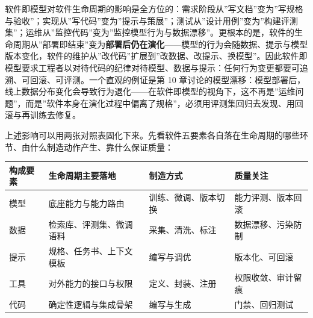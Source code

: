 \documentclass[
]{ctexbook}
\newcounter{none}
\begin{document}
软件即模型对软件生命周期的影响是全方位的：需求阶段从''写文档''变为''写规格与验收''；实现从''写代码''变为''提示与策展''；测试从''设计用例''变为''构建评测集''；运维从''监控代码''变为''监控模型行为与数据漂移''。更根本的是，软件的生命周期从''部署即结束''变为\textbf{部署后仍在演化}------模型的行为会随数据、提示与模型版本变化，软件的维护从''改代码''扩展到''改数据、改提示、换模型''。因此软件即模型要求工程者以对待代码的纪律对待模型、数据与提示：任何行为变更都要可追溯、可回滚、可评测。一个直观的例证是第
10
章讨论的模型漂移：模型部署后，线上数据分布变化会导致行为退化------在软件即模型的视角下，这不再是''运维问题''，而是''软件本身在演化过程中偏离了规格''，必须用评测集回归去发现、用回滚与再训练去修复。

上述影响可以用两张对照表固化下来。先看软件五要素各自落在生命周期的哪些环节、由什么制造动作产生、靠什么保证质量：

{\def\LTcaptype{none} %
\begin{longtable}[]{@{}
  >{\raggedright\arraybackslash}p{}
  >{\raggedright\arraybackslash}p{}
  >{\raggedright\arraybackslash}p{}
  >{\raggedright\arraybackslash}p{}@{}}
\toprule\noalign{}
\begin{minipage}[b]{\linewidth}\raggedright
构成要素
\end{minipage} & \begin{minipage}[b]{\linewidth}\raggedright
生命周期主要落地
\end{minipage} & \begin{minipage}[b]{\linewidth}\raggedright
制造方式
\end{minipage} & \begin{minipage}[b]{\linewidth}\raggedright
质量关注
\end{minipage} \\
\midrule\noalign{}
\endhead
\bottomrule\noalign{}
\endlastfoot
模型 & 底座能力与能力路由 & 训练、微调、版本切换 & 能力评测、版本回滚 \\
数据 & 检索库、评测集、微调语料 & 采集、清洗、标注 &
数据漂移、污染防制 \\
提示 & 规格、任务书、上下文模板 & 编写与调优 & 版本化、可回滚 \\
工具 & 对外能力的接口与权限 & 定义、封装、注册 & 权限收敛、审计留痕 \\
代码 & 确定性逻辑与集成骨架 & 编写与生成 & 门禁、回归测试 \\
\end{longtable}
}
\end{document}
